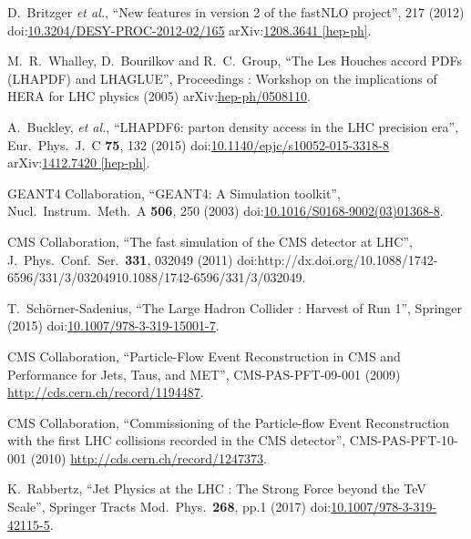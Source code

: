 \begin{thebibliography}{99}
D.~Britzger {\it et al.}, ``New features in version 2 of the fastNLO project'', 217 (2012) doi:\href{http://dx.doi.org/10.3204/DESY-PROC-2012-02/165}{10.3204/DESY-PROC-2012-02/165} arXiv:\href{https://arxiv.org/abs/1208.3641}{1208.3641 [hep-ph]}.

M.~R.~Whalley, D.~Bourilkov and R.~C.~Group, ``The Les Houches accord PDFs (LHAPDF) and LHAGLUE'', Proceedings : Workshop on the implications of HERA for LHC physics (2005) arXiv:\href{https://arxiv.org/abs/hep-ph/0508110}{hep-ph/0508110}.

A.~Buckley, {\it et al.}, ``LHAPDF6: parton density access in the LHC precision era'', Eur.\ Phys.\ J.\ C {\bf 75}, 132 (2015) doi:\href{http://dx.doi.org/10.1140/epjc/s10052-015-3318-8}{10.1140/epjc/s10052-015-3318-8} arXiv:\href{https://arxiv.org/abs/1412.7420}{1412.7420 [hep-ph]}.

GEANT4 Collaboration, ``GEANT4: A Simulation toolkit'', Nucl.\ Instrum.\ Meth.\ A {\bf 506}, 250 (2003) doi:\href{http://dx.doi.org/10.1016/S0168-9002(03)01368-8}{10.1016/S0168-9002(03)01368-8}.

CMS Collaboration, ``The fast simulation of the CMS detector at LHC'', J.\ Phys.\ Conf.\ Ser.\  {\bf 331}, 032049 (2011) doi:{http://dx.doi.org/10.1088/1742-6596/331/3/032049}{10.1088/1742-6596/331/3/032049}.

T.~Schörner-Sadenius, ``The Large Hadron Collider : Harvest of Run 1'', Springer (2015) doi:\href{http://dx.doi.org/10.1007/978-3-319-15001-7}{10.1007/978-3-319-15001-7}.

CMS Collaboration, ``Particle-Flow Event Reconstruction in CMS and Performance for Jets, Taus, and MET'', CMS-PAS-PFT-09-001 (2009) \url{http://cds.cern.ch/record/1194487}.

CMS Collaboration, ``Commissioning of the Particle-flow Event Reconstruction with the first LHC collisions recorded in the CMS detector'', CMS-PAS-PFT-10-001 (2010) \url{http://cds.cern.ch/record/1247373}.

K.~Rabbertz, ``Jet Physics at the LHC : The Strong Force beyond the TeV Scale'', Springer Tracts Mod.\ Phys.\  {\bf 268}, pp.1 (2017) doi:\href{http://dx.doi.org/10.1007/978-3-319-42115-5}{10.1007/978-3-319-42115-5}.
 


\end{thebibliography}
